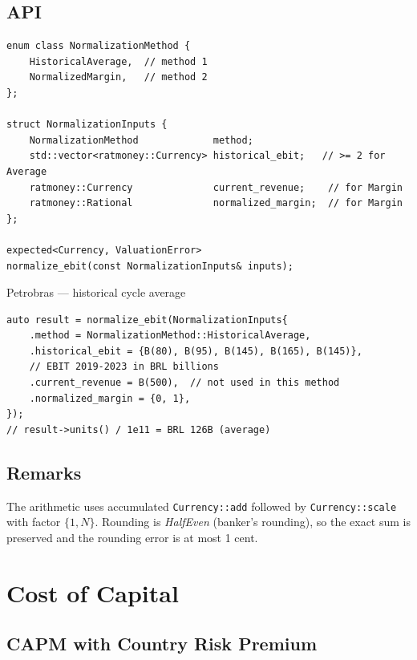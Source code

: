 \documentclass[12pt, a4paper, oneside]{book}
\begin{document}
\section{API}

\begin{lstlisting}[style=cpp]
enum class NormalizationMethod {
    HistoricalAverage,  // method 1
    NormalizedMargin,   // method 2
};

struct NormalizationInputs {
    NormalizationMethod             method;
    std::vector<ratmoney::Currency> historical_ebit;   // >= 2 for Average
    ratmoney::Currency              current_revenue;    // for Margin
    ratmoney::Rational              normalized_margin;  // for Margin
};

expected<Currency, ValuationError>
normalize_ebit(const NormalizationInputs& inputs);
\end{lstlisting}

\begin{example}{Petrobras --- historical cycle average}
\begin{lstlisting}[style=cpp, numbers=none]
auto result = normalize_ebit(NormalizationInputs{
    .method = NormalizationMethod::HistoricalAverage,
    .historical_ebit = {B(80), B(95), B(145), B(165), B(145)},
    // EBIT 2019-2023 in BRL billions
    .current_revenue = B(500),  // not used in this method
    .normalized_margin = {0, 1},
});
// result->units() / 1e11 = BRL 126B (average)
\end{lstlisting}
\end{example}

\section{Remarks}

The arithmetic uses accumulated \texttt{Currency::add} followed by
\texttt{Currency::scale} with factor $\{1, N\}$. Rounding is
\textit{HalfEven} (banker's rounding), so the exact sum is preserved and
the rounding error is at most 1 cent.

\chapter{Cost of Capital}

\section{CAPM with Country Risk Premium}
\label{sec:capm}
\end{document}
